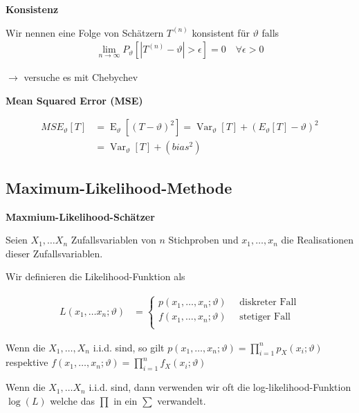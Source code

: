 \documentclass[25pt]{sciposter}
\newcommand{\Var}{\operatorname{Var}}
\newcommand{\E}{\operatorname{E}}
\newenvironment{method}[1]{\begin{mdframed}[backgroundcolor=blue!10,innertopmargin=15pt, innerbottommargin=15pt,nobreak=true]
		\textbf{#1 }
	}
	{ 
	\end{mdframed}
}
\begin{document}
\begin{multicols}{3}
		\begin{method}{Konsistenz}
			Wir nennen eine Folge von Schätzern $T^{(n)}$ konsistent für $\vartheta$ falls
			\begin{align*}
				\lim_{n\to\infty} P_\vartheta [|T^{(n)} - \vartheta| > \epsilon] = 0 \quad \forall \epsilon > 0
			\end{align*}
			
			{\Large $\rightarrow$ versuche es mit Chebychev}
		\end{method}
		
		
		
		
		\begin{method}{Mean Squared Error (MSE)}
			\begin{align*}
				MSE_\vartheta[T] &= \E_\vartheta [(T-\vartheta)^2]= \Var_\vartheta[T] + (E_\vartheta [T]-\vartheta)^2\\
				&=  \Var_\vartheta[T] + (bias^2)
			\end{align*}
		\end{method}
		
		
		
		
		\subsection*{Maximum-Likelihood-Methode}
		
		\begin{method}{Maxmium-Likelihood-Schätzer}
			Seien $X_1,\ldots X_n$ Zufallsvariablen von $n$ Stichproben und $x_1,\ldots,x_n$ die Realisationen dieser Zufallsvariablen.	
			
			Wir definieren die Likelihood-Funktion als
			
			\begin{align*}
				L(x_1,\ldots x_n;\vartheta) &= \begin{cases}
					p(x_1,\ldots,x_n;\vartheta) \quad \text{ diskreter Fall}\\
					f(x_1,\ldots,x_n;\vartheta) \quad \text{ stetiger Fall}\\
				\end{cases}
			\end{align*}
			
			Wenn die $X_1,\ldots,X_n$ i.i.d. sind, so gilt $p(x_1,\ldots,x_n;\vartheta) = \prod_{i=1}^{n}p_X(x_i;\vartheta)$ respektive $f(x_1,\ldots,x_n;\vartheta) = \prod_{i=1}^{n}f_X(x_i;\vartheta)$
			
			Wenn die $X_1,\ldots X_n$ i.i.d. sind, dann verwenden wir oft die log-likelihood-Funktion $\log(L)$ welche das $\prod$ in ein $\sum$ verwandelt.
			

\end{method}
\end{multicols}
\end{document}

